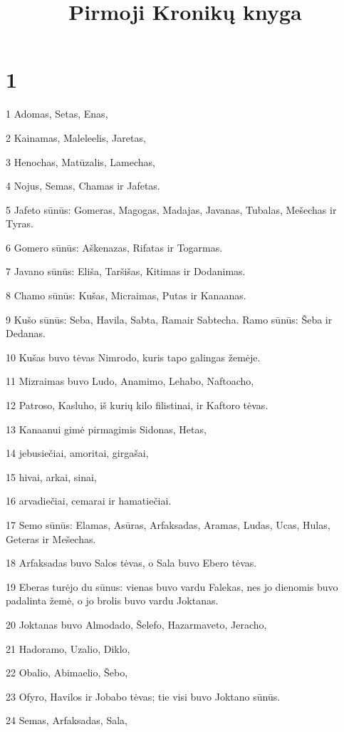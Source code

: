 

\title{Pirmoji Kronikų knyga}

\chapter{1}

\par 1 Adomas, Setas, Enas, 
\par 2 Kainamas, Maleleelis, Jaretas, 
\par 3 Henochas, Matūzalis, Lamechas, 
\par 4 Nojus, Semas, Chamas ir Jafetas. 
\par 5 Jafeto sūnūs: Gomeras, Magogas, Madajas, Javanas, Tubalas, Mešechas ir Tyras. 
\par 6 Gomero sūnūs: Aškenazas, Rifatas ir Togarmas. 
\par 7 Javano sūnūs: Eliša, Taršišas, Kitimas ir Dodanimas. 
\par 8 Chamo sūnūs: Kušas, Micraimas, Putas ir Kanaanas. 
\par 9 Kušo sūnūs: Seba, Havila, Sabta, Ramair Sabtecha. Ramo sūnūs: Šeba ir Dedanas. 
\par 10 Kušas buvo tėvas Nimrodo, kuris tapo galingas žemėje. 
\par 11 Mizraimas buvo Ludo, Anamimo, Lehabo, Naftoacho, 
\par 12 Patroso, Kasluho, iš kurių kilo filistinai, ir Kaftoro tėvas. 
\par 13 Kanaanui gimė pirmagimis Sidonas, Hetas, 
\par 14 jebusiečiai, amoritai, girgašai, 
\par 15 hivai, arkai, sinai, 
\par 16 arvadiečiai, cemarai ir hamatiečiai. 
\par 17 Semo sūnūs: Elamas, Asūras, Arfaksadas, Aramas, Ludas, Ucas, Hulas, Geteras ir Mešechas. 
\par 18 Arfaksadas buvo Salos tėvas, o Sala buvo Ebero tėvas. 
\par 19 Eberas turėjo du sūnus: vienas buvo vardu Falekas, nes jo dienomis buvo padalinta žemė, o jo brolis buvo vardu Joktanas. 
\par 20 Joktanas buvo Almodado, Šelefo, Hazarmaveto, Jeracho, 
\par 21 Hadoramo, Uzalio, Diklo, 
\par 22 Obalio, Abimaelio, Šebo, 
\par 23 Ofyro, Havilos ir Jobabo tėvas; tie visi buvo Joktano sūnūs. 
\par 24 Semas, Arfaksadas, Sala, 

